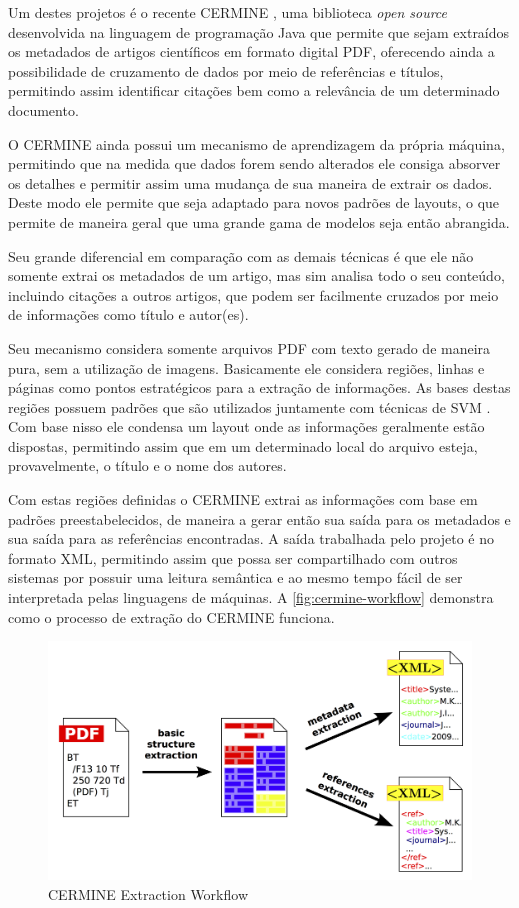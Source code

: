 Um destes projetos é o recente CERMINE \cite{cermine}, uma biblioteca \textit{open source} desenvolvida na linguagem de programação Java que permite que sejam extraídos os metadados de artigos científicos em formato digital PDF, oferecendo ainda a possibilidade de cruzamento de dados por meio de referências e títulos, permitindo assim identificar citações bem como a relevância de um determinado documento.

O CERMINE ainda possui um mecanismo de aprendizagem da própria máquina, permitindo que na medida que dados forem sendo alterados ele consiga absorver os detalhes e permitir assim uma mudança de sua maneira de extrair os dados. Deste modo ele permite que seja adaptado para novos padrões de layouts, o que permite de maneira geral que uma grande gama de modelos seja então abrangida. 

Seu grande diferencial em comparação com as demais técnicas é que ele não somente extrai os metadados de um artigo, mas sim analisa todo o seu conteúdo, incluindo citações a outros artigos, que podem ser facilmente cruzados por meio de informações como título e autor(es).

Seu mecanismo considera somente arquivos PDF com texto gerado de maneira pura, sem a utilização de imagens. Basicamente ele considera regiões, linhas e páginas como pontos estratégicos para a extração de informações. As bases destas regiões possuem padrões que são utilizados juntamente com técnicas de SVM \cite{Han-SVM}. Com base nisso ele condensa um layout onde as informações geralmente estão dispostas, permitindo assim que em um determinado local do arquivo esteja, provavelmente, o título e o nome dos autores. 

Com estas regiões definidas o CERMINE extrai as informações com base em padrões preestabelecidos, de maneira a gerar então sua saída para os metadados e sua saída para as referências encontradas. A saída trabalhada pelo projeto é no formato XML, permitindo assim que possa ser compartilhado com outros sistemas por possuir uma leitura semântica e ao mesmo tempo fácil de ser interpretada pelas linguagens de máquinas. A \autoref{fig:cermine-workflow} demonstra como o processo de extração do CERMINE funciona.

\begin{figure}
\centering
\caption{CERMINE Extraction Workflow}
\label{fig:cermine-workflow}
\includegraphics[width=0.7\linewidth]{./assets/cermine}
\end{figure}

